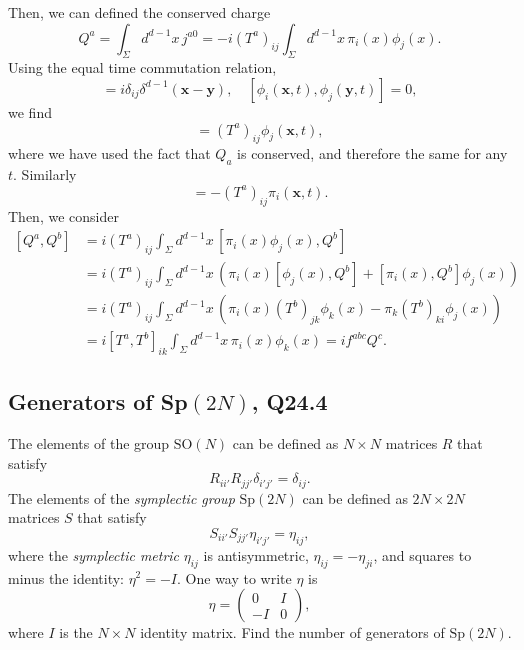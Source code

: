 \begin{solution}
    Then, we can defined the conserved charge
    \begin{equation}
        Q^a = \int_{\Sigma}d^{d-1}x\, j^{a0} = -i(T^a)_{ij}\int_{\Sigma}d^{d-1}x\,\pi_i(x)\phi_j(x).
    \end{equation}
    Using the equal time commutation relation, 
    \begin{equation}
        [\phi_i(\mathbf{x},t), \pi_j(\mathbf{y},t)] = i\delta_{ij}\delta^{d-1}(\mathbf{x}-\mathbf{y}),\quad [\phi_i(\mathbf{x},t), \phi_j(\mathbf{y},t)] = 0,
    \end{equation}
    we find
    \begin{equation}
        [\phi_i(\mathbf{x},t), Q^a] = (T^a)_{ij}\phi_j(\mathbf{x},t),
    \end{equation}
    where we have used the fact that $Q_a$ is conserved, and therefore the same for any $t$.
    Similarly
    \begin{equation}
        [\pi_i(\mathbf{x},t), Q^a] = - (T^a)_{ij}\pi_i(\mathbf{x},t).
    \end{equation}
    Then, we consider
    \begin{equation}
    \begin{aligned}
        [Q^a,Q^b] &= i(T^a)_{ij}\int_{\Sigma}d^{d-1}x\,[\pi_i(x)\phi_j(x), Q^b]\\
        &= i(T^a)_{ij}\int_{\Sigma}d^{d-1}x\,\left(\pi_i(x)[\phi_j(x), Q^b] +[\pi_i(x), Q^b]\phi_j(x)\right)\\
        &=i(T^a)_{ij}\int_{\Sigma}d^{d-1}x\,(\pi_i(x)(T^b)_{jk}\phi_k(x) - \pi_k(T^b)_{ki}\phi_j(x))\\
        &=i[T^a,T^b]_{ik}\int_{\Sigma}d^{d-1}x\,\pi_i(x)\phi_k(x) = if^{abc}Q^c.
    \end{aligned}
    \end{equation}
\end{solution}

\subsection{Generators of Sp$(2N)$, Q24.4}

The elements of the group $\mathrm{SO}(N)$ can be defined as $N\times N$ matrices $R$ that satisfy
\begin{equation}
    R_{ii'}R_{jj'}\delta_{i'j'} = \delta_{ij}.
\end{equation}
The elements of the \emph{symplectic group} $\mathrm{Sp}(2N)$ can be defined as $2N\times 2N$ matrices $S$ that satisfy
\begin{equation}
    S_{ii'}S_{jj'}\eta_{i'j'} = \eta_{ij},
\end{equation}
where the \emph{symplectic metric} $\eta_{ij}$ is antisymmetric, $\eta_{ij}=-\eta_{ji}$, and squares to minus the identity: $\eta^2 = -I$. One way to write $\eta$ is
\begin{equation}
    \eta = \begin{pmatrix} 0 & I \\ -I & 0 \end{pmatrix},
\end{equation}
where $I$ is the $N\times N$ identity matrix. Find the number of generators of $\mathrm{Sp}(2N)$.

